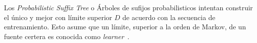


Los \emph{Probabilistic Suffix Tree} o Árboles de sufijos probabilisticos intentan construir el único y mejor \VMM con límite superior $D$ de acuerdo con la secuencia de entrenamiento. Esto asume que un límite, superior a la orden de Markov, de un fuente certera es conocida como \emph{learner}~\cite{PenaSordo2015}.
 
 





